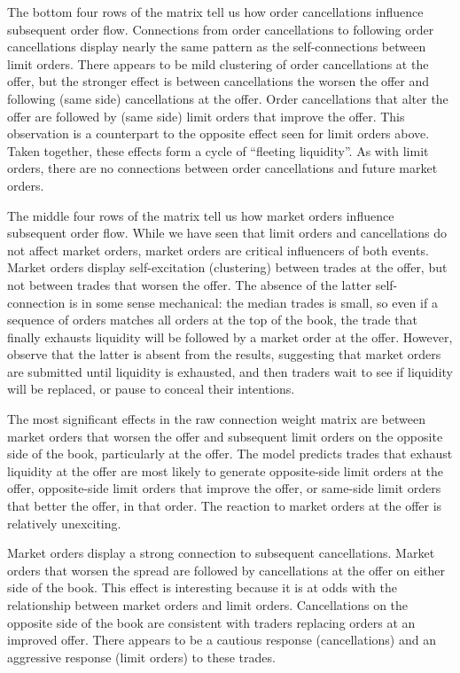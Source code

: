 		The bottom four rows of the matrix tell us how order cancellations influence subsequent order flow. Connections from order cancellations to following order cancellations display nearly the same pattern as the self-connections between limit orders. There appears to be mild clustering of order cancellations at the offer, but the stronger effect is between cancellations the worsen the offer and following (same side) cancellations at the offer. Order cancellations that alter the offer are followed by (same side) limit orders that improve the offer. This observation is a counterpart to the opposite effect seen for limit orders above. Taken together, these effects form a cycle of ``fleeting liquidity''. As with limit orders, there are no connections between order cancellations and future market orders.

		The middle four rows of the matrix tell us how market orders influence subsequent order flow. While we have seen that limit orders and cancellations do not affect market orders, market orders are critical influencers of both events. Market orders display self-excitation (clustering) between trades at the offer, but not between trades that worsen the offer. The absence of the latter self-connection is in some sense mechanical: the median trades is small, so even if a sequence of orders matches all orders at the top of the book, the trade that finally exhausts liquidity will be followed by a market order at the offer. However, observe that the latter is absent from the results, suggesting that market orders are submitted until liquidity is exhausted, and then traders wait to see if liquidity will be replaced, or pause to conceal their intentions.

		The most significant effects in the raw connection weight matrix are between market orders that worsen the offer and subsequent limit orders on the opposite side of the book, particularly at the offer. The model predicts trades that exhaust liquidity at the offer are most likely to generate opposite-side limit orders at the offer, opposite-side limit orders that improve the offer, or same-side limit orders that better the offer, in that order. The reaction to market orders at the offer is relatively unexciting.

		Market orders display a strong connection to subsequent cancellations. Market orders that worsen the spread are followed by cancellations at the offer on either side of the book. This effect is interesting because it is at odds with the relationship between market orders and limit orders. Cancellations on the opposite side of the book are consistent with traders replacing orders at an improved offer. There appears to be a cautious response (cancellations) and an aggressive response (limit orders) to these trades.

